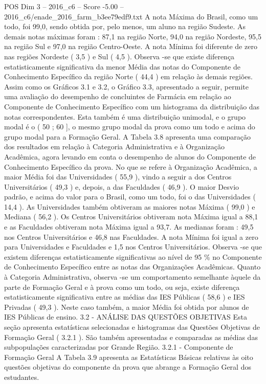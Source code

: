 \begin{textsample}{POS Dim 3 – 2016\_c6 – Score -5.00 – 2016\_c6/enade\_2016\_farm\_b3ee79edf9.txt}
A nota Máxima do Brasil, como um todo, foi 99,0, sendo obtida por, pelo menos, um aluno na região Sudeste.
As demais notas máximas foram : 87,1 na região Norte, 94,0 na região Nordeste, 95,5 na região Sul e 97,0 na região Centro-Oeste.
A nota Mínima foi diferente de zero nas regiões Nordeste ( 3,5 ) e Sul ( 4,5 ).
Observa -se que existe diferença estatisticamente significativa da menor Média das notas do Componente de Conhecimento Específico da região Norte ( 44,4 ) em relação às demais regiões.
Assim como os Gráficos 3.1 e 3.2, o Gráfico 3.3, apresentado a seguir, permite uma avaliação do desempenho de concluintes de Farmácia em relação ao Componente de Conhecimento Específico com um histograma da distribuição das notas correspondentes.
Esta também é uma distribuição unimodal, e o grupo modal é o ( 50 ; 60 ], o mesmo grupo modal da prova como um todo e acima do grupo modal para a Formação Geral.
A Tabela 3.8 apresenta uma comparação dos resultados em relação à Categoria Administrativa e à Organização Acadêmica, agora levando em conta o desempenho de alunos do Componente de Conhecimento Específico da prova.
No que se refere à Organização Acadêmica, a maior Média foi das Universidades ( 55,9 ), vindo a seguir a dos Centros Universitários ( 49,3 ) e, depois, a das Faculdades ( 46,9 ).
O maior Desvio padrão, e acima do valor para o Brasil, como um todo, foi o das Universidades ( 14,4 ).
As Universidades também obtiveram as maiores notas Máxima ( 99,0 ) e Mediana ( 56,2 ).
Os Centros Universitários obtiveram nota Máxima igual a 88,1 e as Faculdades obtiveram nota Máxima igual a 93,7.
As medianas foram : 49,5 nos Centros Universitários e 46,8 nas Faculdades.
A nota Mínima foi igual a zero para Universidades e Faculdades e 1,5 nos Centros Universitários.
Observa -se que existem diferenças estatisticamente significativas ao nível de 95 \% no Componente de Conhecimento Específico entre as notas das Organizações Acadêmicas.
Quanto à Categoria Administrativa, observa -se um comportamento semelhante àquele da parte de Formação Geral e à prova como um todo, ou seja, existe diferença estatisticamente significativa entre as médias das IES Públicas ( 58,6 ) e IES Privadas ( 49,3 ).
Neste caso também, a maior Média foi obtida por alunos de IES Públicas de ensino. 3.2 - ANÁLISE DAS QUESTÕES OBJETIVAS Esta seção apresenta estatísticas selecionadas e histogramas das Questões Objetivas de Formação Geral ( 3.2.1 ).
São também apresentadas e comparadas as médias das subpopulações caracterizadas por Grande Região. 3.2.1 - Componente de Formação Geral A Tabela 3.9 apresenta as Estatísticas Básicas relativas às oito questões objetivas do componente da prova que abrange a Formação Geral dos estudantes.

\end{textsample}
